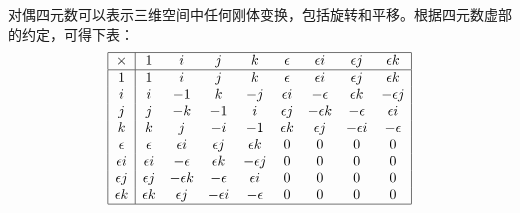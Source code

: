 \begin{note}
    对偶四元数可以表示三维空间中任何刚体变换，包括旋转和平移。根据四元数虚部的约定，可得下表：
    \[
        \begin{array}{|c|cccccccc|}
            \hline
            \times & 1 & i & j & k & \epsilon & \epsilon i & \epsilon j & \epsilon k \\
            \hline
            1 & 1 & i & j & k & \epsilon & \epsilon i & \epsilon j & \epsilon k \\
            i & i & -1 & k & -j & \epsilon i & -\epsilon & \epsilon k & -\epsilon j \\
            j & j & -k & -1 & i & \epsilon j & -\epsilon k & -\epsilon & \epsilon i \\
            k & k & j & -i & -1 & \epsilon k & \epsilon j & -\epsilon i & -\epsilon \\
            \epsilon  & \epsilon & \epsilon i & \epsilon j & \epsilon k & 0 & 0 & 0 & 0 \\
            \epsilon i & \epsilon i & -\epsilon & \epsilon k & -\epsilon j & 0 & 0 & 0 & 0 \\
            \epsilon j & \epsilon j & -\epsilon k & -\epsilon & \epsilon i & 0 & 0 & 0 & 0 \\
            \epsilon k & \epsilon k & \epsilon j & -\epsilon i & -\epsilon & 0 & 0 & 0 & 0 \\
            \hline
        \end{array}
    \]

\end{note}

\newpage